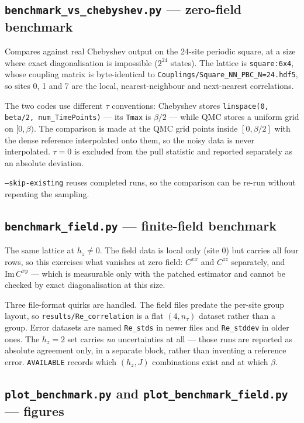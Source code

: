 \documentclass[11pt,a4paper]{article}
\newcommand{\code}[1]{\texttt{#1}}
\newcommand{\file}[1]{\texttt{\textbf{#1}}}
\begin{document}
\subsection{\file{benchmark\_vs\_chebyshev.py} --- zero-field benchmark}

Compares against real Chebyshev output on the 24-site periodic square, at a size
where exact diagonalisation is impossible ($2^{24}$ states). The lattice is
\code{square:6x4}, whose coupling matrix is byte-identical to
\code{Couplings/Square\_NN\_PBC\_N=24.hdf5}, so sites 0, 1 and 7 are the local,
nearest-neighbour and next-nearest correlations.

The two codes use different $\tau$ conventions: Chebyshev stores
\code{linspace(0, beta/2, num\_TimePoints)} --- its \code{Tmax} is $\beta/2$ ---
while QMC stores a uniform grid on $[0,\beta)$. The comparison is made at the
QMC grid points inside $[0,\beta/2]$ with the dense reference interpolated onto
them, so the noisy data is never interpolated. $\tau=0$ is excluded from the
pull statistic and reported separately as an absolute deviation.

\code{--skip-existing} reuses completed runs, so the comparison can be re-run
without repeating the sampling.

\subsection{\file{benchmark\_field.py} --- finite-field benchmark}

The same lattice at $h_z \neq 0$. The field data is local only (site 0) but
carries all four rows, so this exercises what vanishes at zero field:
$C^{xx}$ and $C^{zz}$ separately, and $\mathrm{Im}\,C^{xy}$ --- which is
measurable only with the patched estimator and cannot be checked by exact
diagonalisation at this size.

Three file-format quirks are handled. The field files predate the per-site group
layout, so \code{results/Re\_correlation} is a flat $(4, n_\tau)$ dataset rather
than a group. Error datasets are named \code{Re\_stds} in newer files and
\code{Re\_stddev} in older ones. The $h_z=2$ set carries \emph{no} uncertainties
at all --- those runs are reported as absolute agreement only, in a separate
block, rather than inventing a reference error. \code{AVAILABLE} records which
$(h_z, J)$ combinations exist and at which $\beta$.

\subsection{\file{plot\_benchmark.py} and \file{plot\_benchmark\_field.py} --- figures}
\end{document}

